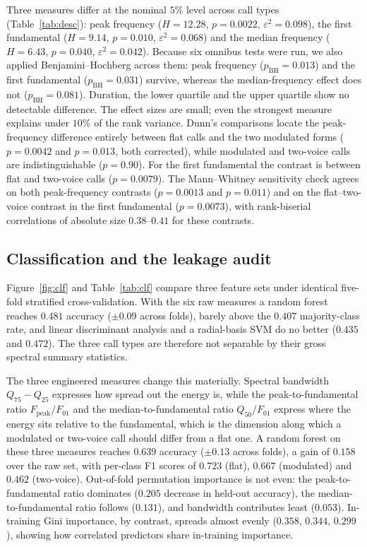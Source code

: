 \documentclass{apmcmthesis}
\begin{document}
Three measures differ at the nominal $5\%$ level across call types
(Table~\ref{tab:desc}): peak frequency ($H=12.28$, $p=0.0022$, $\varepsilon^2=0.098$),
the first fundamental ($H=9.14$, $p=0.010$, $\varepsilon^2=0.068$) and the median
frequency ($H=6.43$, $p=0.040$, $\varepsilon^2=0.042$). Because six omnibus tests were
run, we also applied Benjamini--Hochberg across them: peak frequency
($p_{\mathrm{BH}}=0.013$) and the first fundamental ($p_{\mathrm{BH}}=0.031$) survive,
whereas the median-frequency effect does not ($p_{\mathrm{BH}}=0.081$). Duration, the
lower quartile and the upper quartile show no detectable difference. The effect sizes are
small; even the strongest measure explains under $10\%$ of the rank variance. Dunn's comparisons locate
the peak-frequency difference entirely between flat calls and the two modulated forms
($p=0.0042$ and $p=0.013$, both corrected), while modulated and two-voice calls are
indistinguishable ($p=0.90$). For the first fundamental the contrast is between flat and
two-voice calls ($p=0.0079$). The Mann--Whitney sensitivity check agrees on both
peak-frequency contrasts ($p=0.0013$ and $p=0.011$) and on the flat--two-voice contrast
in the first fundamental ($p=0.0073$), with rank-biserial correlations of absolute size
$0.38$--$0.41$ for these contrasts.

\subsection{Classification and the leakage audit}

Figure~\ref{fig:clf} and Table~\ref{tab:clf} compare three feature sets under identical
five-fold stratified cross-validation. With the six raw measures a random forest\cite{breiman} reaches
$0.481$ accuracy ($\pm0.09$ across folds), barely above the $0.407$ majority-class rate, and linear discriminant
analysis and a radial-basis SVM do no better ($0.435$ and $0.472$). The three call types
are therefore not separable by their gross spectral summary statistics.

The three engineered measures change this materially. Spectral bandwidth $Q_{75}-Q_{25}$
expresses how spread out the energy is, while the peak-to-fundamental ratio
$F_{\mathrm{peak}}/F_{01}$ and the median-to-fundamental ratio $Q_{50}/F_{01}$ express
where the energy sits relative to the fundamental, which is the dimension along which a
modulated or two-voice call should differ from a flat one. A random forest on these three
measures reaches $0.639$ accuracy ($\pm0.13$ across folds), a gain of $0.158$ over the raw set, with per-class F1
scores of $0.723$ (flat), $0.667$ (modulated) and $0.462$ (two-voice). Out-of-fold
permutation importance is not even: the peak-to-fundamental ratio dominates ($0.205$
decrease in held-out accuracy), the median-to-fundamental ratio follows ($0.131$), and
bandwidth contributes least ($0.053$). In-training Gini importance, by contrast, spreads
almost evenly ($0.358$, $0.344$, $0.299$), showing how correlated predictors share
in-training importance.
\end{document}
